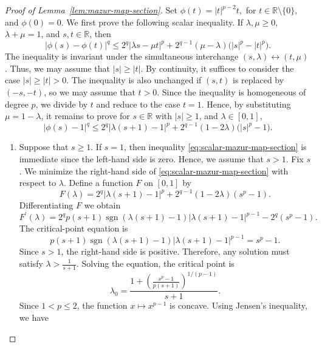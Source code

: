\documentclass[10pt,a4paper]{amsart}
\newcommand{\R}{\mathbb R}
\begin{document}
\begin{proof}[Proof of Lemma~\ref{lem:mazur-map-section}] 
Set $\phi(t)=|t|^{p-2}t,$ for $ t\in\R\setminus\{0\},$ and $\phi(0)=0.$ We first prove the following scalar inequality. If
$\lambda,\mu\geq0$, $\lambda+\mu=1$, and $s,t\in\R$, then
\begin{equation}
\label{eq:scalar-mazur-map-section-claim}
    |\phi(s)-\phi(t)|^q
    \leq
    2^q|\lambda s-\mu t|^p
    +
    2^{q-1}(\mu-\lambda)
    \bigl(|s|^p-|t|^p\bigr).
\end{equation}
The inequality is invariant under the simultaneous interchange $(s,\lambda)\leftrightarrow(t,\mu)$. Thus, we may assume that $|s| \geq |t|$. By continuity, it suffices to consider the case $
|s|\geq |t|>0$. The inequality is also unchanged if $(s,t)$ is replaced by $(-s,-t)$, so we may assume that $t > 0$. Since the inequality is homogeneous of degree $p$, we divide by $t$ and reduce to the case $t=1$. Hence, by substituting $\mu = 1-\lambda$, it remains to prove for $s \in \R$ with $|s| \geq 1$, and $\lambda \in [0,1]$,
\begin{equation}
\label{eq:scalar-mazur-map-section}
    |\phi(s)-1|^q
    \leq
    2^q|\lambda (s+1)-1 |^p
    +
    2^{q-1}(1-2\lambda)
    \bigl(|s|^p-1\bigr).
\end{equation}
\begin{enumerate}[wide =0pt, labelwidth= 1.1cm]
    \item[\bf Case 1:] Suppose that $s \geq 1$. If $s = 1$, then inequality \eqref{eq:scalar-mazur-map-section} is immediate since the left-hand side is zero. Hence, we assume that $s > 1$. Fix $s$. We minimize the right-hand side of \eqref{eq:scalar-mazur-map-section} with respect to $\lambda$. Define a function $F$ on $[0,1]$ by 
    \[
        F(\lambda) = 2^q|\lambda(s+1)-1|^p+2^{q-1}(1-2 \lambda)\left(s^p-1\right).
    \]
    Differentiating $F$ we obtain 
    \[
        F^{\prime}(\lambda)=2^q p(s+1) \operatorname{sgn}(\lambda(s+1)-1)|\lambda(s+1)-1|^{p-1}-2^q\left(s^p-1\right).
    \]
    The critical-point equation is 
    $$
        p(s+1)\operatorname{sgn}(\lambda(s+1)-1)|\lambda(s+1)-1|^{p-1}=s^p-1 .
    $$
    Since $ s > 1$, the right-hand side is positive. Therefore,  any solution must satisfy $\lambda > \frac{1}{s+1}$. Solving the equation, the critical point is
    \[
        \lambda_0 =\frac{1+\left(\frac{s^p-1}{p(s+1)}\right)^{1 /(p-1)}}{s+1}.
    \]
    Since $1< p \leq 2$, the function $x \mapsto x^{p-1}$ is concave. Using Jensen's inequality, we have 
    \begin{equation}

\end{equation}
\end{enumerate}
\end{proof}
\end{document}

